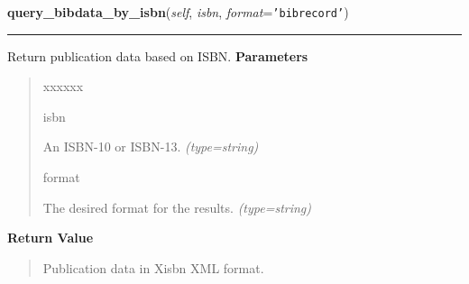     \vspace{0.5ex}

\hspace{.8\funcindent}\begin{boxedminipage}{\funcwidth}

    \raggedright \textbf{query\_bibdata\_by\_isbn}(\textit{self}, \textit{isbn}, \textit{format}={\tt \texttt{'}\texttt{bibrecord}\texttt{'}})

    \vspace{-1.5ex}

    \rule{\textwidth}{0.5\fboxrule}
\setlength{\parskip}{2ex}

Return publication data based on ISBN.
\setlength{\parskip}{1ex}
      \textbf{Parameters}
      \vspace{-1ex}

      \begin{quote}
        \begin{Ventry}{xxxxxx}

          \item[isbn]


An ISBN-10 or ISBN-13.
            {\it (type=string)}

          \item[format]


The desired format for the results.
            {\it (type=string)}

        \end{Ventry}

      \end{quote}

      \textbf{Return Value}
    \vspace{-1ex}

      \begin{quote}

Publication data in Xisbn XML format.
      \end{quote}

    \end{boxedminipage}

    \label{biblio:webquery:isbndb:IsbndbQuery:query_author_by_name}

    \vspace{0.5ex}

